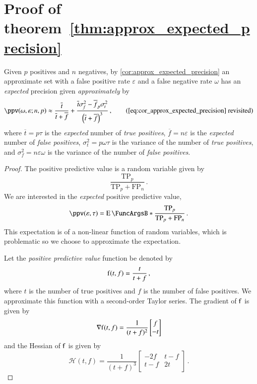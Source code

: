 \documentclass[10pt,final,hidelinks]{article}
\numberwithin{equation}{section}
\newcommand{\TP}{\RV{TP}}
\newcommand{\FP}{\RV{FP}}
\newcommand{\tprate}{\tau}
\newcommand{\fprate}{\varepsilon}
\newcommand{\fnrate}{\omega}
\newcommand{\RV}[1]{\mathrm{#1}}
\theoremstyle{plain}
\begin{document}
{\section{Proof of theorem~\ref{thm:approx_expected_precision}}
\label{sec:proof_approx_expected_precision}
Given $p$ positives and $n$ negatives, by \cref{cor:approx_expected_precision} an approximate set with a false positive rate $\fprate$ and a false negative rate $\fnrate$ has an \emph{expected} precision given \emph{approximately} by
\begin{equation*}
    \ppv(\fnrate, \fprate ; n, p) \approx \frac{\overline{t}}{\overline{t} + \overline{f}} +
    \frac{\overline{t} \sigma_{\!f}^2 - \overline{f}_p \sigma_{\!t}^2}{\left(\overline{t} + \overline{f}\right)^3}\,,
    \tag{\ref{eq:cor_approx_expected_precision} revisited}
\end{equation*}
where $\overline{t} = p \tprate$ is the \emph{expected} number of \emph{true positives}, $\overline{f} =  n \fprate$ is the \emph{expected} number of \emph{false positives}, $\sigma_{\!t}^2 = p \fnrate \tprate$ is the variance of the number of \emph{true positives}, and $\sigma_{\!f}^2 = n \fprate \fnrate$ is the variance of the number of \emph{false positives}.
\begin{proof}
The positive predictive value is a random variable given by
\begin{equation}
    \frac{\TP_p}{\TP_p + \FP_n}\,.
\end{equation}
We are interested in the \emph{expected} positive predictive value,
\begin{equation}
    \ppv(\fprate,\tprate) = \Expect{\frac{\TP_p}{\TP_p + \FP_n}}\,.
\end{equation}
This expectation is of a non-linear function of random variables, which is problematic so we choose to approximate the expectation.

Let the \emph{positive predictive value} function be denoted by
\begin{equation}
    \Fun{f}(t, f) = \frac{t}{t + f}\,,
\end{equation}
where $t$ is the number of true positives and $f$ is the number of false positives.
We approximate this function with a second-order Taylor series.
The gradient of $\Fun{f}$ is given by
\begin{equation}
    \nabla{\Fun{f}}(t,f) =
    \frac{1}{(t + f)^2}
    \begin{bmatrix}
        f\\
        -t\\
    \end{bmatrix}
\end{equation}
and the Hessian of $\Fun{f}$ is given by
\begin{equation}
    \mathcal{H}(t,f) =
    \frac{1}{(t + f)^3}
    \begin{bmatrix}
        -2 f & t-f\\
        t-f & 2 t \\
    \end{bmatrix}\,.
\end{equation}


\end{proof}}
\end{document}
